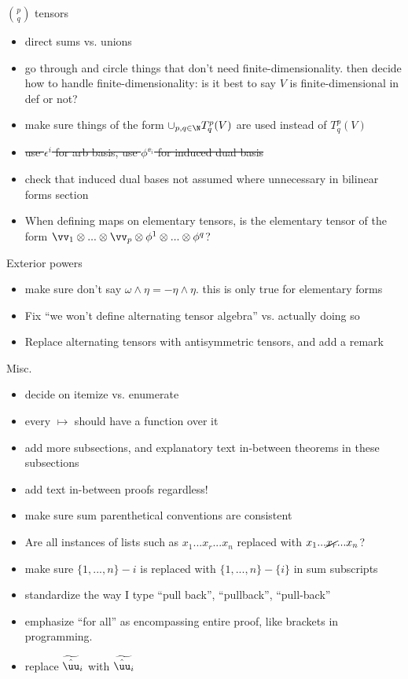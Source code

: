 $\binom{p}{q}$ tensors

\begin{itemize}
    \item direct sums vs. unions
    \item go through and circle things that don't need finite-dimensionality. then decide how to handle finite-dimensionality: is it best to say $V$ is finite-dimensional in def or not?
    \item make sure things of the form $\cup_{p, q \in \N} T^p_q(V)$ are used instead of $T^p_q(V)$
    \item \sout{use $\epsilon^i$ for arb basis, use $\phi^{\ee_i}$ for induced dual basis}
    \item check that induced dual bases not assumed where unnecessary in bilinear forms section
    \item When defining maps on elementary tensors, is the elementary tensor of the form $\vv_1 \otimes ... \otimes \vv_p \otimes \phi^1 \otimes ... \otimes \phi^q$?
\end{itemize}

Exterior powers

\begin{itemize}
    \item make sure don't say $\omega \wedge \eta = - \eta \wedge \eta$. this is only true for elementary forms
    \item Fix ``we won't define alternating tensor algebra'' vs. actually doing so
    \item Replace alternating tensors with antisymmetric tensors, and add a remark
\end{itemize}

Misc.

\begin{itemize}
    \item decide on itemize vs. enumerate
    \item every $\mapsto$ should have a function over it
    \item add more subsections, and explanatory text in-between theorems in these subsections
    \item add text in-between proofs regardless!
    \item make sure sum parenthetical conventions are consistent
    \item Are all instances of lists such as $x_1 ... x_r ... x_n$ replaced with  $x_1 ... \cancel{x_r} ... x_n$?
    \item make sure $\{1, ..., n\} - i$ is replaced with $\{1, ..., n\} - \{i\}$ in sum subscripts 
    \item standardize the way I type ``pull back'', ``pullback'', ``pull-back''
    \item emphasize ``for all'' as encompassing entire proof, like brackets in programming.
    \item replace $\widetilde{\hat{\uu}}_i$ with $\widetilde{\hat{\uu}_i}$
\end{itemize}

